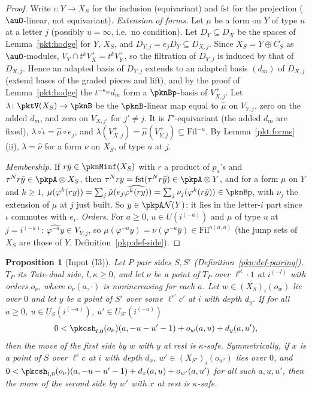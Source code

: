 \documentclass[10pt]{amsart}
\newtheorem{proposition}[theorem]{Proposition}
\theoremstyle{definition}
\theoremstyle{remark}
\begin{document}
\begin{proof}
Write $\iota\colon Y\to X_S$ for the inclusion (equivariant) and $\mathrm{fst}$ for the projection
($\auO$-linear, not equivariant). \emph{Extension of forms.} Let $\mu$ be a form on $Y$ of type $u$ at a
letter $j$ (possibly $u=\infty$, i.e.\ no condition). Let $D_Y\subseteq D_X$ be the spaces of
Lemma~\ref{pkt:hodge} for $Y$, $X_S$, and $D_{Y,j}=e_jD_Y\subseteq D_{X,j}$. Since $X_S=Y\oplus C_S$ as
$\auO$-modules, $V_Y\cap t^kV^+_X=t^kV^+_Y$, so the filtration of $D_{Y,j}$ is induced by that of $D_{X,j}$.
Hence an adapted basis of $D_{Y,j}$ extends to an adapted basis $(d_m)$ of $D_{X,j}$ (extend bases of the
graded pieces and lift), and by the proof of Lemma~\ref{pkt:hodge} the $t^{-\kappa_m}d_m$ form a
$\pknBp$-basis of $V^+_{X,j}$. Let $\lambda\colon\pktV(X_S)\to\pknB$ be the $\pknB$-linear map equal to
$\hat\mu$ on $V_{Y,j}$, zero on the added $d_m$, and zero on $V_{X,j'}$ for $j'\ne j$. It is
$\Gamma'$-equivariant (the added $d_m$ are fixed), $\lambda\circ\hat\iota=\hat\mu\circ e_j$, and
$\lambda(V^+_{X,j})=\hat\mu(V^+_{Y,j})\subseteq\mathrm{Fil}^{-u}$. By Lemma~\ref{pkt:forms}(ii), $\lambda=\hat\nu$
for a form $\nu$ on $X_S$, of type $u$ at $j$.

\emph{Membership.} If $r\bar y\in\pknMinf(X_S)$ with $r$ a product of $p_a$'s and $\tau^N r\bar y\in
\pkpA\otimes X_S$, then $\tau^Nry=\mathrm{fst}(\tau^Nr\bar y)\in\pkpA\otimes Y$, and for a form $\mu$ on $Y$
and $k\ge1$, $\mu(\varphi^k(ry))=\sum_j\hat\mu(e_j\widehat{\varphi^k(ry)})=\sum_j\nu_j(\varphi^k(r\bar y))
\in\pknBp$, with $\nu_j$ the extension of $\mu$ at $j$ just built. So $y\in\pkpA\mathcal N(Y)$; it lies in the
letter-$i$ part since $\iota$ commutes with $e_i$. \emph{Orders.} For $a\ge0$, $u\in U(i^{(-a)})$ and $\mu$ of
type $u$ at $j=i^{(-a)}$: $\widehat{\varphi^{-a}y}\in V_{Y,j}$, so $\mu(\varphi^{-a}y)=\nu(\varphi^{-a}\bar y)\in
\mathrm{Fil}^{o(a,u)}$ (the jump sets of $X_S$ are those of $Y$, Definition~\ref{pkp:def-side}).
\end{proof}

\begin{proposition}[Input (I3)]\label{pkt:I3}
Let $P$ pair sides $S,S'$ (Definition~\ref{pkp:def-pairing}), $T_P$ its Tate-dual side, $l,\kappa\ge0$, and
let $\nu$ be a point of $T_P$ over $\ell^\kappa\cdot1$ at $i^{(-l)}$ with orders $o_\nu$, where $o_\nu(a,\cdot)$
is nonincreasing for each $a$. Let $w\in(X_S)_i(o_w)$ lie over $0$ and let $y$ be a point of $S'$ over some
$\ell^{e'}c'$ at $i$ with depth $d_y$. If for all $a\ge0$, $u\in U_S(i^{(-a)})$, $u'\in U_{S'}(i^{(-a)})$
\[
0<\pkcsh_{l,0}(o_\nu)(a,-u-u'-1)+o_w(a,u)+d_y(a,u'),
\]
then the move of the first side by $w$ with $y$ at rest is $\kappa$-safe. Symmetrically, if $x$ is a point of
$S$ over $\ell^ec$ at $i$ with depth $d_x$, $w'\in(X_{S'})_i(o_{w'})$ lies over $0$, and $0<\pkcsh_{l,0}(o_\nu)
(a,-u-u'-1)+d_x(a,u)+o_{w'}(a,u')$ for all such $a,u,u'$, then the move of the second side by $w'$ with $x$ at
rest is $\kappa$-safe.
\end{proposition}
\end{document}
